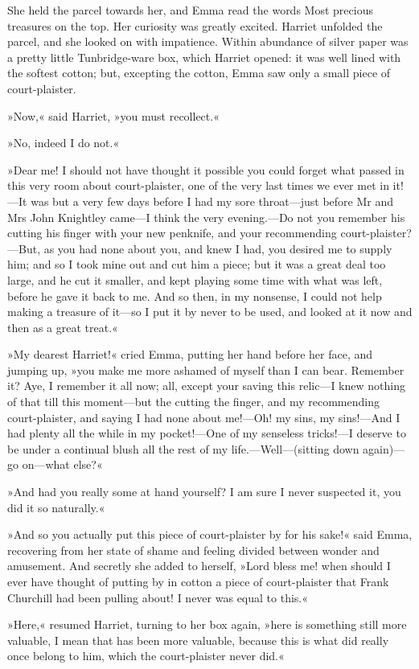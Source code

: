 She held the parcel towards her, and Emma read the words Most precious treasures on the top. Her curiosity was greatly excited. Harriet unfolded the parcel, and she looked on with impatience. Within abundance of silver paper was a pretty little Tunbridge-ware box, which Harriet opened: it was well lined with the softest cotton; but, excepting the cotton, Emma saw only a small piece of court-plaister.

»Now,« said Harriet, »you must recollect.«

»No, indeed I do not.«

»Dear me! I should not have thought it possible you could forget what passed in this very room about court-plaister, one of the very last times we ever met in it!—It was but a very few days before I had my sore throat—just before Mr and Mrs John Knightley came—I think the very evening.—Do not you remember his cutting his finger with your new penknife, and your recommending court-plaister?—But, as you had none about you, and knew I had, you desired me to supply him; and so I took mine out and cut him a piece; but it was a great deal too large, and he cut it smaller, and kept playing some time with what was left, before he gave it back to me. And so then, in my nonsense, I could not help making a treasure of it—so I put it by never to be used, and looked at it now and then as a great treat.«

»My dearest Harriet!« cried Emma, putting her hand before her face, and jumping up, »you make me more ashamed of myself than I can bear. Remember it? Aye, I remember it all now; all, except your saving this relic—I knew nothing of that till this moment—but the cutting the finger, and my recommending court-plaister, and saying I had none about me!—Oh! my sins, my sins!—And I had plenty all the while in my pocket!—One of my senseless tricks!—I deserve to be under a continual blush all the rest of my life.—Well—(sitting down again)—go on—what else?«

»And had you really some at hand yourself? I am sure I never suspected it, you did it so naturally.«

»And so you actually put this piece of court-plaister by for his sake!« said Emma, recovering from her state of shame and feeling divided between wonder and amusement. And secretly she added to herself, »Lord bless me! when should I ever have thought of putting by in cotton a piece of court-plaister that Frank Churchill had been pulling about! I never was equal to this.«

»Here,« resumed Harriet, turning to her box again, »here is something still more valuable, I mean that has been more valuable, because this is what did really once belong to him, which the court-plaister never did.«

